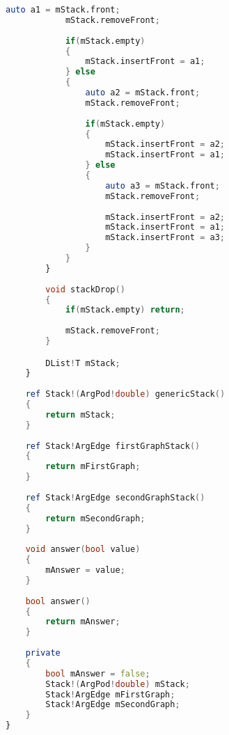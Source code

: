 \documentclass[russian,utf8,emptystyle]{eskdtext}
\begin{document}
\begin{lstlisting}[language=D]
            auto a1 = mStack.front;
            mStack.removeFront;
            
            if(mStack.empty)
            {
                mStack.insertFront = a1;
            } else
            {
                auto a2 = mStack.front;
                mStack.removeFront;
                
                if(mStack.empty)
                {
                    mStack.insertFront = a2;
                    mStack.insertFront = a1;
                } else
                {
                    auto a3 = mStack.front;
                    mStack.removeFront;
                    
                    mStack.insertFront = a2;
                    mStack.insertFront = a1;
                    mStack.insertFront = a3;
                }
            }
        }
        
        void stackDrop()
        {
            if(mStack.empty) return;
            
            mStack.removeFront;
        }

        DList!T mStack;
    }
    
    ref Stack!(ArgPod!double) genericStack()
    {
        return mStack;
    }
    
    ref Stack!ArgEdge firstGraphStack()
    {
        return mFirstGraph;
    }
    
    ref Stack!ArgEdge secondGraphStack()
    {
        return mSecondGraph;
    }
    
    void answer(bool value)
    {
        mAnswer = value;
    }
    
    bool answer()
    {
        return mAnswer;
    }
    
    private
    {
        bool mAnswer = false;
        Stack!(ArgPod!double) mStack;
        Stack!ArgEdge mFirstGraph;
        Stack!ArgEdge mSecondGraph;
    }
}

\end{lstlisting}
\end{document}

